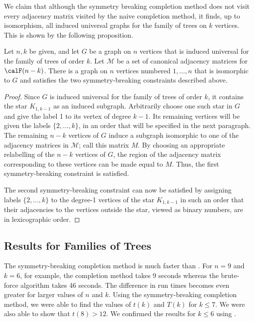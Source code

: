 We claim that although the symmetry breaking completion method does not
visit every adjacency matrix visited by the naive completion method,
it finds, up to isomorphism, all induced universal graphs for the family
of trees on $k$ vertices.  This is shown by the following proposition.

\begin{proposition}
    Let $n, k$ be given, and let $G$ be a graph on $n$ vertices that is
    induced universal for the family of trees of order $k$.  Let $\mathcal{M}$
    be a set of canonical adjacency matrices for $\calF(n-k)$.  There is
    a graph on $n$ vertices numbered $1, \dots, n$ that is isomorphic
    to $G$ and satisfies the two symmetry-breaking constraints described
    above.
\end{proposition}
\begin{proof}
    Since $G$ is induced universal for the family of trees of order $k$, it
    contains the star $K_{1,k-1}$ as an induced subgraph.  Arbitrarily
    choose one such star in $G$ and give the label 1 to its vertex of degree
    $k-1$.  Its remaining vertices will be given the labels $\{2, \dots, k\}$,
    in an order that will be specified in the next paragraph.
    The remaining $n-k$ vertices of $G$ induce a subgraph isomorphic
    to one of the adjacency matrices in $\mathcal{M}$; call this matrix $M$.
    By choosing an appropriate relabelling of the $n-k$ vertices of $G$,
    the region of the adjacency matrix corresponding to these vertices
    can be made equal to $M$.  Thus, the first symmetry-breaking constraint
    is satisfied.

    The second symmetry-breaking constraint can now be satisfied by assigning
    labels $\{2, \dots, k\}$ to the degree-1 vertices of the star $K_{1,k-1}$
    in such an order that their adjacencies to the vertices outside the star,
    viewed as binary numbers, are in lexicographic order.
\end{proof}

\subsection{Results for Families of Trees}

The symmetry-breaking completion method is much faster than .
For $n=9$ and $k=6$, for example, the completion method takes 9 seconds whereas
the brute-force algorithm takes 46 seconds. The difference in run times becomes
even greater for larger values of $n$ and $k$.
Using the symmetry-breaking completion method,
we were able to find the values of $t(k)$ and $T(k)$ for $k \leq 7$. We were also
able to show that $t(8) > 12$.  We confirmed
the results for $k \leq 6$ using .


